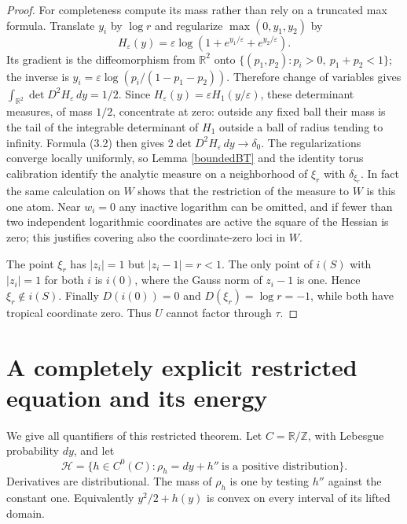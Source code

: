 \documentclass[11pt]{article}
\theoremstyle{definition}\newtheorem{definition}[theorem]{Definition}
\newcommand{\R}{\mathbb R}
\newcommand{\Z}{\mathbb Z}
\begin{document}
\begin{proof}
For completeness compute its mass rather than rely on a truncated max
formula. Translate $y_i$ by $\log r$ and regularize
$\max(0,y_1,y_2)$ by
\[
 H_\varepsilon(y)=\varepsilon\log(1+e^{y_1/\varepsilon}
                                      +e^{y_2/\varepsilon}).
\]
Its gradient is the diffeomorphism from $\R^2$ onto
$\{(p_1,p_2):p_i>0,\ p_1+p_2<1\}$; the inverse is
$y_i=\varepsilon\log(p_i/(1-p_1-p_2))$. Therefore change of variables
gives $\int_{\R^2}\det D^2H_\varepsilon\,dy=1/2$.
Since $H_\varepsilon(y)=\varepsilon H_1(y/\varepsilon)$, these
determinant measures, of mass $1/2$, concentrate at zero: outside any
fixed ball their mass is the tail of the integrable determinant of $H_1$
outside a ball of radius tending to infinity. Formula (3.2) then gives
$2\det D^2H_\varepsilon\,dy\to\delta_0$.
The regularizations converge locally uniformly, so Lemma \ref{boundedBT}
and the identity torus calibration identify the analytic measure on a
neighborhood of $\xi_r$ with $\delta_{\xi_r}$. In fact the same calculation
on $W$ shows that the restriction of the measure to $W$ is this one atom.
Near $w_i=0$ any inactive logarithm can be omitted, and if fewer than two
independent logarithmic coordinates are active the square of the Hessian
is zero; this justifies covering also the coordinate-zero loci in $W$.

The point $\xi_r$ has $|z_i|=1$ but $|z_i-1|=r<1$.
The only point of $i(S)$ with $|z_i|=1$ for both $i$ is $i(0)$, where
the Gauss norm of $z_i-1$ is one. Hence $\xi_r\notin i(S)$.
Finally $D(i(0))=0$ and $D(\xi_r)=\log r=-1$, while both have tropical
coordinate zero. Thus $U$ cannot factor through $\tau$.
\end{proof}

\section{A completely explicit restricted equation and its energy}
We give all quantifiers of this restricted theorem. Let $C=\R/\Z$, with
Lebesgue probability $dy$, and let
\[
 \mathcal H=\{h\in C^0(C):\rho_h=dy+h''\ \text{is a positive distribution}\}.
                                                               \tag{5.1}
\]
Derivatives are distributional. The mass of $\rho_h$ is one by testing
$h''$ against the constant one. Equivalently $y^2/2+h(y)$ is convex
on every interval of its lifted domain.
\end{document}
